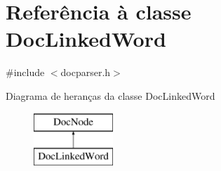 \hypertarget{class_doc_linked_word}{\section{Referência à classe Doc\-Linked\-Word}
\label{class_doc_linked_word}
}


{\ttfamily \#include $<$docparser.\-h$>$}

Diagrama de heranças da classe Doc\-Linked\-Word\begin{figure}[H]
\begin{center}
\leavevmode
\includegraphics[height=2.000000cm]{class_doc_linked_word}
\end{center}
\end{figure}
